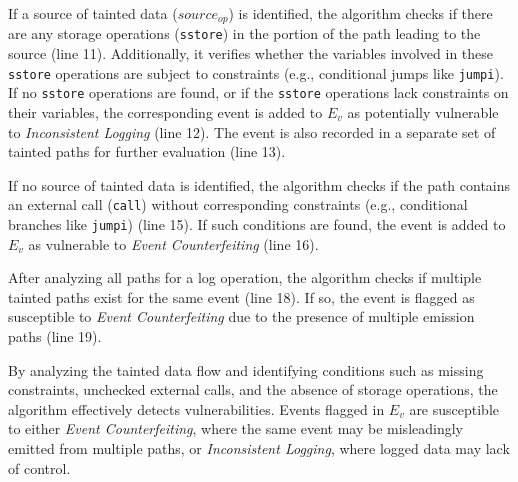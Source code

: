 If a source of tainted data (\(source_{op}\)) is identified, the algorithm checks if there are any storage operations (\texttt{sstore}) in the portion of the path leading to the source (line 11). Additionally, it verifies whether the variables involved in these \texttt{sstore} operations are subject to constraints (e.g., conditional jumps like \texttt{jumpi}). If no \texttt{sstore} operations are found, or if the \texttt{sstore} operations lack constraints on their variables, the corresponding event is added to \(E_v\) as potentially vulnerable to \emph{Inconsistent Logging} (line 12). The event is also recorded in a separate set of tainted paths for further evaluation (line 13).

If no source of tainted data is identified, the algorithm checks if the path contains an external call (\texttt{call}) without corresponding constraints (e.g., conditional branches like \texttt{jumpi}) (line 15). If such conditions are found, the event is added to \(E_v\) as vulnerable to \emph{Event Counterfeiting} (line 16).

After analyzing all paths for a log operation, the algorithm checks if multiple tainted paths exist for the same event (line 18). If so, the event is flagged as susceptible to \emph{Event Counterfeiting} due to the presence of multiple emission paths (line 19).

By analyzing the tainted data flow and identifying conditions such as missing constraints, unchecked external calls, and the absence of storage operations, the algorithm effectively detects vulnerabilities. Events flagged in \(E_v\) are susceptible to either \emph{Event Counterfeiting}, where the same event may be misleadingly emitted from multiple paths, or \emph{Inconsistent Logging}, where logged data may lack of control.




